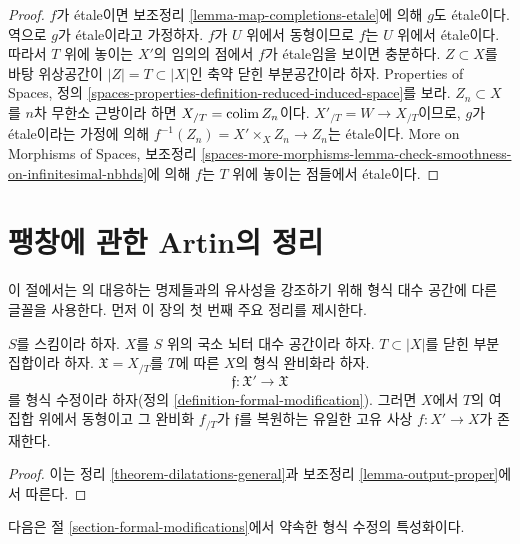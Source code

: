 \begin{proof}
$f$가 \'etale이면 보조정리
\ref{lemma-map-completions-etale}에 의해 $g$도 \'etale이다.
역으로 $g$가 \'etale이라고 가정하자.
$f$가 $U$ 위에서 동형이므로 $f$는 $U$ 위에서 \'etale이다.
따라서 $T$ 위에 놓이는 $X'$의 임의의 점에서
$f$가 \'etale임을 보이면 충분하다.
$Z \subset X$를 바탕 위상공간이
$|Z| = T \subset |X|$인 축약 닫힌 부분공간이라 하자.
Properties of Spaces, 정의
\ref{spaces-properties-definition-reduced-induced-space}를 보라.
$Z_n \subset X$를 $n$차 무한소 근방이라 하면
$X_{/T} = \mathop{\mathrm{colim}}\nolimits Z_n$이다.
$X'_{/T} = W \to X_{/T}$이므로,
$g$가 \'etale이라는 가정에 의해
$f^{-1}(Z_n) = X' \times_X Z_n \to Z_n$는 \'etale이다.
More on Morphisms of Spaces, 보조정리
\ref{spaces-more-morphisms-lemma-check-smoothness-on-infinitesimal-nbhds}에 의해
$f$는 $T$ 위에 놓이는 점들에서 \'etale이다.
\end{proof}


\section{팽창에 관한 Artin의 정리}
\label{section-dilatations}

\noindent
이 절에서는 \cite{ArtinII}의 대응하는 명제들과의 유사성을 강조하기 위해
형식 대수 공간에 다른 글꼴을 사용한다. 먼저 이 장의 첫 번째 주요 정리를 제시한다.

\begin{theorem}
\label{theorem-dilatations}
\begin{reference}
\cite[Theorem 3.2]{ArtinII}
\end{reference}
$S$를 스킴이라 하자. $X$를 $S$ 위의 국소 뇌터 대수 공간이라 하자.
$T \subset |X|$를 닫힌 부분집합이라 하자.
$\mathfrak X = X_{/T}$를
$T$에 따른 $X$의 형식 완비화라 하자.
$$
\mathfrak f : \mathfrak X' \to \mathfrak X
$$
를 형식 수정이라 하자(정의 \ref{definition-formal-modification}).
그러면 $X$에서 $T$의 여집합 위에서 동형이고 그 완비화 $f_{/T}$가
$\mathfrak f$를 복원하는 유일한 고유 사상 $f : X' \to X$가 존재한다.
\end{theorem}

\begin{proof}
이는 정리 \ref{theorem-dilatations-general}과
보조정리 \ref{lemma-output-proper}에서 따른다.
\end{proof}

\noindent
다음은 절 \ref{section-formal-modifications}에서 약속한
형식 수정의 특성화이다.

